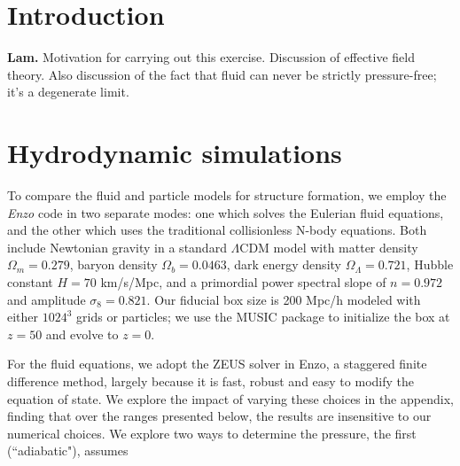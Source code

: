 \documentclass[aps,showpacs,twocolumn,floats,prd,superscriptaddress,nofootinbib]{revtex4}
\begin{document}

\maketitle

\section{Introduction}

{\bf Lam.} Motivation for carrying out this exercise.
Discussion of effective field theory. Also discussion
of the fact that fluid can never be strictly pressure-free;
it's a degenerate limit.

\section{Hydrodynamic simulations}

To compare the fluid and particle models for structure formation, we
employ the {\it Enzo} code \cite{Enzo2014} in two separate modes:
one which solves the Eulerian fluid equations, and the other which
uses the traditional collisionless N-body equations.  Both include
Newtonian gravity in a standard $\Lambda$CDM model with
matter density $\Omega_m = 0.279$, baryon density $\Omega_b = 0.0463$,
dark energy density $\Omega_\Lambda = 0.721$, Hubble constant
$H = 70$ km/s/Mpc, and a primordial power spectral slope of $n=0.972$
and amplitude $\sigma_8 = 0.821$.  Our fiducial box
size is 200 Mpc/h modeled with either $1024^3$ grids or particles;
we use the MUSIC package \cite{MUSIC} to initialize the box at $z=50$ and evolve
to $z=0$.  

For the fluid equations, we adopt the ZEUS solver in Enzo, a staggered
finite difference method,
largely because it is fast, robust and easy to modify the equation of state.
We explore the impact of varying these choices in the appendix, finding
that over the ranges presented below, the results are insensitive to our
numerical choices.  We explore two ways to determine the pressure, the 
first (``adiabatic"), assumes




\end{document}
